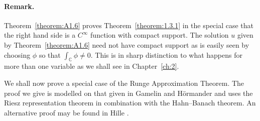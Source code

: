 \paragraph*{Remark.} Theorem~\ref{theorem:A1.6} proves Theorem~\ref{theorem:1.3.1} in the special case that the right hand side is a $C^\infty$ function with compact support. The solution $u$ given by Theorem~\ref{theorem:A1.6} need not have compact support as is easily seen by choosing $\phi$ so that $\int_{\mathbb C}\phi\ne0$. This is in sharp distinction to what happens for more than one variable as we shall see in Chapter~\ref{ch:2}.

We shall now prove a special case of the Runge Approximation Theorem. The proof we give is modelled on that given in Gamelin \cite{bib:I:gamelin-t-w:1} and H\"ormander \cite{bib:I:hormander-l:1} and uses the Riesz representation theorem in combination with the Hahn--Banach theorem. An alternative proof may be found in Hille \cite{bib:I:hille-e:1}.

